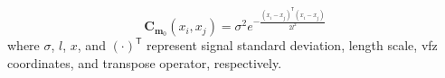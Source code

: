 \begin{equation} \label{eq:squared-exponential}
	\mathbf{C}_{\mathbf{m}_0}\!\left(x_i,x_j\right) = {\sigma}^2 e^{-\frac{\left(x_i-x_j\right)^\mathsf{T}\left(x_i-x_j\right)}{2{l}^2}}
\end{equation}
where $\sigma$, $l$, $x$, and ${\left(\cdot\right)} ^{\mathsf{T}}$ represent signal standard deviation, length scale, \gls{vfz} coordinates, and transpose operator, respectively.